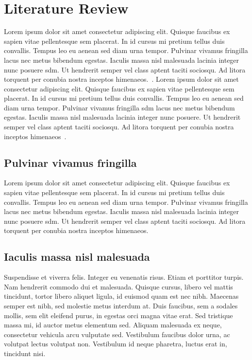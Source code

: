 \chapter{Literature Review}

Lorem ipsum dolor sit amet consectetur adipiscing elit. Quisque faucibus ex sapien vitae pellentesque sem placerat. In id cursus mi pretium tellus duis convallis. Tempus leo eu aenean sed diam urna tempor. Pulvinar vivamus fringilla lacus nec metus bibendum egestas. Iaculis massa nisl malesuada lacinia integer nunc posuere \gls{sdm}. Ut hendrerit semper vel class aptent taciti sociosqu. Ad litora torquent per conubia nostra inceptos himenaeos.~\cite{Topic2_Author_Year}. Lorem ipsum dolor sit amet consectetur adipiscing elit. Quisque faucibus ex sapien vitae pellentesque sem placerat. In id cursus mi pretium tellus duis convallis. Tempus leo eu aenean sed diam urna tempor. Pulvinar vivamus fringilla \gls{sdm} lacus nec metus bibendum egestas. Iaculis massa nisl malesuada lacinia integer nunc posuere. Ut hendrerit semper vel class aptent taciti sociosqu. Ad litora torquent per conubia nostra inceptos himenaeos~\cite{Topic1_Author_Year}. 

\section{Pulvinar vivamus fringilla}

Lorem ipsum dolor sit amet consectetur adipiscing elit. Quisque faucibus ex sapien vitae pellentesque sem placerat. In id cursus mi pretium tellus duis convallis. Tempus leo eu aenean sed diam urna tempor. Pulvinar vivamus fringilla lacus nec metus bibendum egestas. Iaculis massa nisl malesuada lacinia integer nunc posuere \gls{sdm}. Ut hendrerit semper vel class aptent taciti sociosqu. Ad litora torquent per conubia nostra inceptos himenaeos.

\section{Iaculis massa nisl malesuada}

Suspendisse et viverra felis. Integer eu venenatis risus. Etiam et porttitor turpis. Nam hendrerit commodo dui et malesuada. Quisque cursus, libero vel mattis tincidunt, tortor libero aliquet ligula, id euismod quam est nec nibh. Maecenas semper est nibh, sed molestie metus interdum at. Duis faucibus, sem a sodales mollis, sem elit eleifend purus, in egestas orci magna vitae erat. Sed tristique massa mi, id auctor metus elementum sed. Aliquam malesuada ex neque, consectetur vehicula arcu vulputate sed. Vestibulum faucibus dolor urna, ac volutpat lectus volutpat non. Vestibulum id neque pharetra, luctus erat in, tincidunt nisi.


